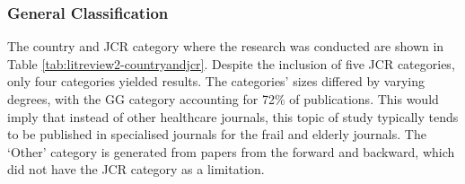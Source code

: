 \documentclass[../thesis.tex]{subfiles}
\begin{document}
\subsubsection{General Classification}
The country and JCR category where the research was conducted are shown in Table \ref{tab:litreview2-countryandjcr}. Despite the inclusion of five JCR categories, only four categories yielded results. The categories' sizes differed by varying degrees, with the GG category accounting for 72\% of publications. This would imply that instead of other healthcare journals, this topic of study typically tends to be published in specialised journals for the frail and elderly journals. The `Other' category is generated from papers from the forward and backward, which did not have the JCR category as a limitation. 
\begin{table}[h!]
    \centering
    \caption{Number of papers which fall into each JCR category and the location of the where the research was conducted.}
    \label{tab:litreview2-countryandjcr}
\end{table}
\end{document}
